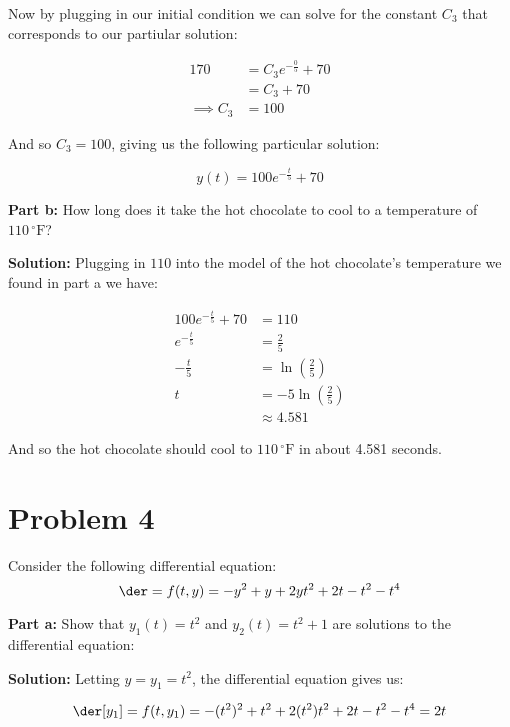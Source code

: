 \documentclass{article}
\begin{document}
Now by plugging in our initial condition we can solve for the constant $C_3$ that corresponds to our partiular solution:

\begin{align*}
    170&=C_3e^{-\frac{0}{5}}+70\tag{$(t,y)=(0,170)$}\\
    &=C_3+70\\
    \implies C_3&=100
\end{align*}

And so $C_3=100$, giving us the following particular solution:

\begin{equation*}
    y(t)=100e^{-\frac{t}{5}}+70
\end{equation*}

\bigskip

\noindent\textbf{Part b:}  How long does it take the hot chocolate to cool to a temperature of $110\,{^\circ\text{F}}$?
\bigskip

\noindent\textbf{Solution:} Plugging in $110$ into the model of the hot chocolate's temperature we found in part a we have:

\begin{align*}
    100e^{-\frac{t}{5}}+70&=110\tag{$y(t)=110$}\\
    e^{-\frac{t}{5}}&=\frac{2}{5}\tag{algebra}\\
    -\frac{t}{5}&=\ln\left(\frac{2}{5}\right)\tag{$\ln()$ both sides}\\    
    t&=-5\ln\left(\frac{2}{5}\right)\tag{algebra}\\
    &\approx4.581    
\end{align*}

And so the hot chocolate should cool to $110\,{^\circ\text{F}}$ in about 4.581 seconds.

\section*{Problem 4}
Consider the following differential equation:
\begin{equation*}
    \der=f(t,y)=-y^2+y+2yt^2+2t-t^2-t^4
\end{equation*}
\smallskip

\noindent\textbf{Part a:} Show that $y_1(t)=t^2$ and $y_2(t)=t^2+1$ are solutions to the differential equation:
\bigskip

\noindent\textbf{Solution:} Letting $y=y_1=t^2$, the differential equation gives us:

\begin{equation*}
    \der[y_1]=f(t,y_1)=-(t^2)^2+t^2+2(t^2)t^2+2t-t^2-t^4=2t
\end{equation*}
\end{document}
